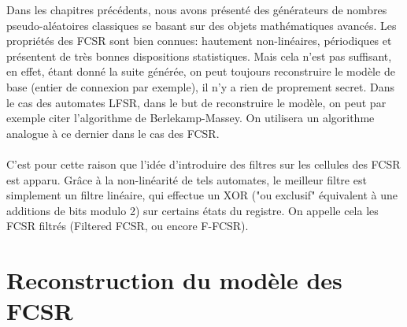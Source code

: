 \documentclass[11pt]{report}
\begin{document}
	Dans les chapitres précédents, nous avons présenté des générateurs de nombres pseudo-aléatoires classiques se basant sur des objets mathématiques avancés. Les propriétés des FCSR sont bien connues: hautement non-linéaires, périodiques et présentent de très bonnes dispositions statistiques. Mais cela n'est pas suffisant, en effet, étant donné la suite générée, on peut toujours reconstruire le modèle de base (entier de connexion par exemple), il n'y a rien de proprement secret.  Dans le cas des automates LFSR, dans le but de reconstruire le modèle, on peut par exemple citer l'algorithme de Berlekamp-Massey. On utilisera un algorithme analogue à ce dernier dans le cas des FCSR. 
	\\
	\\	
	C'est pour cette raison que l'idée d'introduire des filtres sur les cellules des FCSR est apparu. Grâce à la non-linéarité de tels automates, le meilleur filtre est simplement un filtre linéaire, qui effectue un XOR ("ou exclusif" équivalent à une additions de bits modulo 2) sur certains états du registre. On appelle cela les FCSR filtrés (Filtered FCSR, ou encore F-FCSR). 

\section{Reconstruction du modèle des FCSR}
\end{document}
